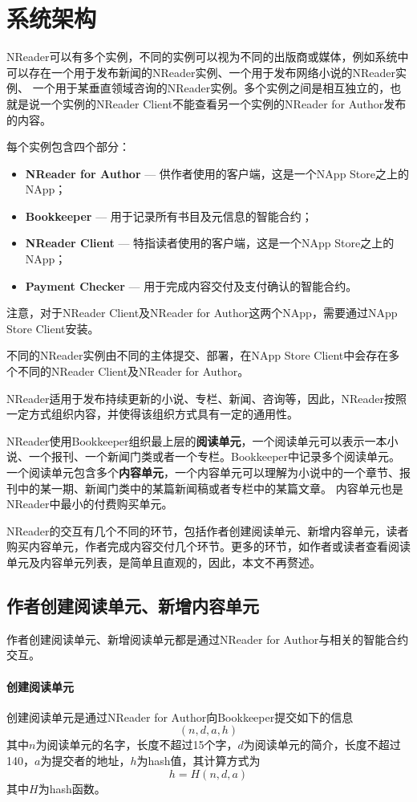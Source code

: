 \section{系统架构}

NReader可以有多个实例，不同的实例可以视为不同的出版商或媒体，例如系统中可以存在一个用于发布新闻的NReader实例、一个用于发布网络小说的NReader实例、
一个用于某垂直领域咨询的NReader实例。多个实例之间是相互独立的，也就是说一个实例的NReader Client不能查看另一个实例的NReader for Author发布的内容。

每个实例包含四个部分：
\begin{itemize}
\item \textbf{NReader for Author} --- 供作者使用的客户端，这是一个NApp Store之上的NApp；
\item \textbf{Bookkeeper} --- 用于记录所有书目及元信息的智能合约；
\item \textbf{NReader Client} --- 特指读者使用的客户端，这是一个NApp Store之上的NApp；
\item \textbf{Payment Checker} --- 用于完成内容交付及支付确认的智能合约。 
\end{itemize}
\noindent 注意，对于NReader Client及NReader for Author这两个NApp，需要通过NApp Store Client安装。

不同的NReader实例由不同的主体提交、部署，在NApp Store Client中会存在多个不同的NReader Client及NReader for Author。

NReader适用于发布持续更新的小说、专栏、新闻、咨询等，因此，NReader按照一定方式组织内容，并使得该组织方式具有一定的通用性。

NReader使用Bookkeeper组织最上层的\textbf{阅读单元}，一个阅读单元可以表示一本小说、一个报刊、一个新闻门类或者一个专栏。Bookkeeper中记录多个阅读单元。
一个阅读单元包含多个\textbf{内容单元}，一个内容单元可以理解为小说中的一个章节、报刊中的某一期、新闻门类中的某篇新闻稿或者专栏中的某篇文章。
内容单元也是NReader中最小的付费购买单元。

NReader的交互有几个不同的环节，包括作者创建阅读单元、新增内容单元，读者购买内容单元，作者完成内容交付几个环节。更多的环节，如作者或读者查看阅读单元及内容单元列表，是简单且直观的，因此，本文不再赘述。

\subsection{作者创建阅读单元、新增内容单元}
作者创建阅读单元、新增阅读单元都是通过NReader for Author与相关的智能合约交互。

\paragraph{创建阅读单元}
创建阅读单元是通过NReader for Author向Bookkeeper提交如下的信息
\[
(n, d, a, h)
\]
\noindent 其中\(n\)为阅读单元的名字，长度不超过15个字，\(d\)为阅读单元的简介，长度不超过140，\(a\)为提交者的地址，\(h\)为hash值，其计算方式为
\[h = H(n, d, a)\]
\noindent 其中\(H\)为hash函数。


